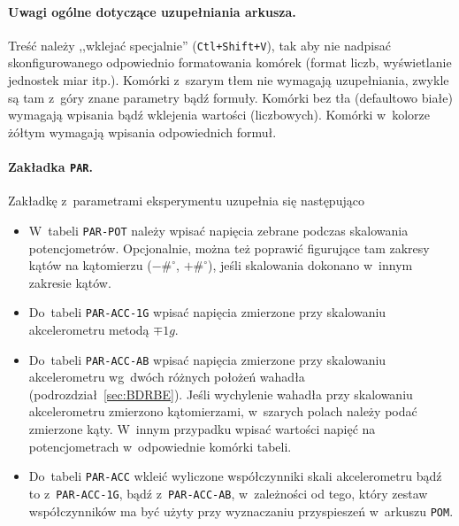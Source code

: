 \documentclass[paper=a4,DIV=12]{lpas}
\begin{document}
\paragraph{Uwagi ogólne dotyczące uzupełniania arkusza.} Treść należy
,,wklejać specjalnie'' (\texttt{Ctl+Shift+V}), tak aby nie nadpisać
skonfigurowanego odpowiednio formatowania komórek (format liczb, wyświetlanie
jednostek miar itp.). Komórki z~szarym tłem nie wymagają uzupełniania, zwykle
są tam z~góry znane parametry bądź formuły. Komórki bez tła (defaultowo białe)
wymagają wpisania bądź wklejenia wartości (liczbowych). Komórki w~kolorze
żółtym wymagają wpisania odpowiednich formuł.

\paragraph{Zakładka \texttt{PAR}.} Zakładkę z~parametrami eksperymentu
uzupełnia się następująco
\begin{itemize}
  \item W~tabeli \texttt{PAR-POT} należy wpisać napięcia zebrane podczas
    skalowania potencjometrów. Opcjonalnie, można też poprawić figurujące tam
    zakresy kątów na kątomierzu ($-\#^{\circ}$, $+\#^{\circ}$), jeśli
    skalowania dokonano w~innym zakresie kątów.
  \item Do~tabeli \texttt{PAR-ACC-1G} wpisać napięcia zmierzone przy
    skalowaniu akcelerometru metodą $\mp 1g$.
  \item Do~tabeli \texttt{PAR-ACC-AB} wpisać napięcia zmierzone przy skalowaniu
    akcelerometru wg~dwóch różnych położeń wahadła
    (podrozdział~\ref{sec:BDRBE}). Jeśli wychylenie wahadła przy skalowaniu
    akcelerometru zmierzono kątomierzami, w~szarych polach należy podać
    zmierzone kąty. W~innym przypadku wpisać wartości napięć na potencjometrach
    w~odpowiednie komórki tabeli.
  \item Do~tabeli \texttt{PAR-ACC} wkleić wyliczone współczynniki skali
    akcelerometru bądź to z~\texttt{PAR-ACC-1G}, bądź z~\texttt{PAR-ACC-AB},
    w~zależności od tego, który zestaw współczynników ma być użyty przy
    wyznaczaniu przyspieszeń w~arkuszu \texttt{POM}.
\end{itemize}
\end{document}
